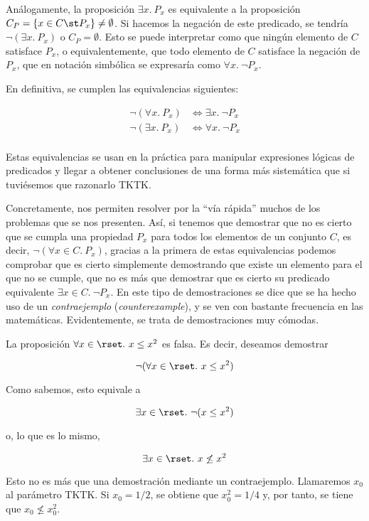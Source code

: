 Análogamente, la proposición $\exists x. \ P_x$ es equivalente a la
proposición $C_P = \{x \in C \st P_x\} \neq \emptyset$. Si hacemos la
negación de este predicado, se tendría $\neg(\exists x. \ P_x)$ o $C_P =
\emptyset$. Esto se puede interpretar como que ningún elemento de $C$
satisface $P_x$, o equivalentemente, que todo elemento de $C$ satisface la
negación de $P_x$, que en notación simbólica se expresaría como $\forall x.\
\neg P_x$.

En definitiva, se cumplen las equivalencias siguientes:

\begin{align*}
  \neg(\forall x.\ P_x) &\iff \exists x.\ \neg P_x \\
  \neg(\exists x.\ P_x) &\iff \forall x.\ \neg P_x \\
\end{align*}

Estas equivalencias se usan en la práctica para manipular expresiones
lógicas de predicados y llegar a obtener conclusiones de una forma más
sistemática que si tuviésemos que razonarlo TKTK.

Concretamente, nos permiten resolver por la ``vía rápida'' muchos de los
problemas que se nos presenten. Así, si tenemos que demostrar que no es
cierto que se cumpla una propiedad $P_x$ para todos los elementos de un
conjunto $C$, es decir, $\neg(\forall x \in C.\ P_x)$, gracias a la primera
de estas equivalencias podemos comprobar que es cierto simplemente
demostrando que existe un elemento para el que no se cumple, que no es más
que demostrar que es cierto su predicado equivalente $\exists x \in C.\ \neg
P_x$. En este tipo de demostraciones se dice que se ha hecho uso de un
\emph{contraejemplo} (\emph{counterexample}), y se ven con bastante
frecuencia en las matemáticas. Evidentemente, se trata de demostraciones muy
cómodas.

\begin{example}
  La proposición $\forall x \in \rset. \ x \leq x^2$ es falsa. Es decir,
  deseamos demostrar

  \[ \neg(\forall x \in \rset. \ x \leq x^2) \]

  \noindent Como sabemos, esto equivale a

  \[ \exists x \in \rset. \ \neg(x \leq x^2) \]

  \noindent o, lo que es lo mismo,

  \[ \exists x \in \rset. \ x \not\leq x^2 \]

  Esto no es más que una demostración mediante un contraejemplo. Llamaremos
  $x_0$ al parámetro TKTK. Si $x_0 = 1/2$, se obtiene que $x_0^2 = 1/4$ y,
  por tanto, se tiene que $x_0 \not\leq x_0^2$.
\end{example}




